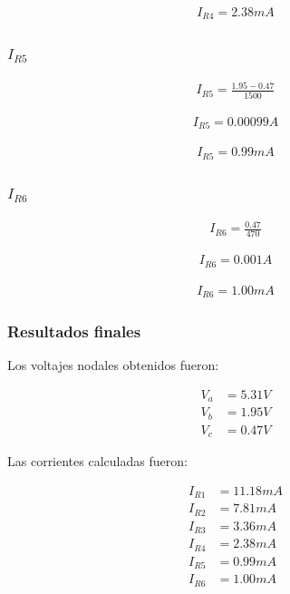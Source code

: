 \documentclass[conference]{IEEEtran}
\begin{document}
\begin{align*}
I_{R4}=2.38mA
\end{align*}

\subsubsection{$I_{R5}$}

\begin{align*}
I_{R5}=\frac{1.95-0.47}{1500}
\end{align*}

\begin{align*}
I_{R5}=0.00099A
\end{align*}

\begin{align*}
I_{R5}=0.99mA
\end{align*}

\subsubsection{$I_{R6}$}

\begin{align*}
I_{R6}=\frac{0.47}{470}
\end{align*}

\begin{align*}
I_{R6}=0.001A
\end{align*}

\begin{align*}
I_{R6}=1.00mA
\end{align*}

\subsubsection{Resultados finales}

Los voltajes nodales obtenidos fueron:

\begin{align*}
V_a &= 5.31V \\
V_b &= 1.95V \\
V_c &= 0.47V
\end{align*}

Las corrientes calculadas fueron:

\begin{align*}
I_{R1} &= 11.18mA \\
I_{R2} &= 7.81mA \\
I_{R3} &= 3.36mA \\
I_{R4} &= 2.38mA \\
I_{R5} &= 0.99mA \\
I_{R6} &= 1.00mA
\end{align*}
\end{document}
